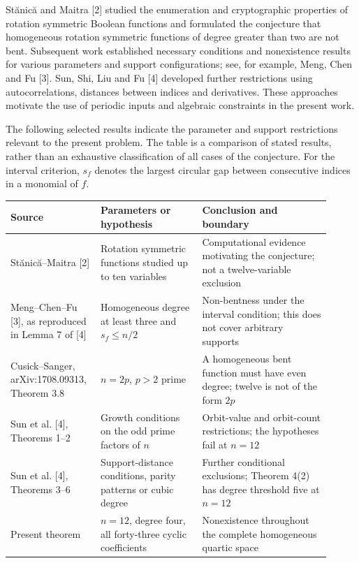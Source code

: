 \documentclass[pdflatex,sn-mathphys-num]{sn-jnl}
\begin{document}
St\u{a}nic\u{a} and Maitra [2] studied the enumeration and cryptographic properties of rotation symmetric Boolean functions and formulated the conjecture that homogeneous rotation symmetric functions of degree greater than two are not bent. Subsequent work established necessary conditions and nonexistence results for various parameters and support configurations; see, for example, Meng, Chen and Fu [3]. Sun, Shi, Liu and Fu [4] developed further restrictions using autocorrelations, distances between indices and derivatives. These approaches motivate the use of periodic inputs and algebraic constraints in the present work.

The following selected results indicate the parameter and support restrictions relevant to the present problem. The table is a comparison of stated results, rather than an exhaustive classification of all cases of the conjecture. For the interval criterion, $s_f$ denotes the largest circular gap between consecutive indices in a monomial of $f$.

{\footnotesize
\setlength{\tabcolsep}{3pt}

\begin{longtable}{@{}>{\raggedright\arraybackslash}p{0.23\linewidth}>{\raggedright\arraybackslash}p{0.3\linewidth}>{\raggedright\arraybackslash}p{0.38\linewidth}@{}}
\toprule
Source & Parameters or hypothesis & Conclusion and boundary \\
\midrule\endhead
St\u{a}nic\u{a}--Maitra [2] & Rotation symmetric functions studied up to ten variables & Computational evidence motivating the conjecture; not a twelve-variable exclusion \\
Meng--Chen--Fu [3], as reproduced in Lemma 7 of [4] & Homogeneous degree at least three and $s_f\le n/2$ & Non-bentness under the interval condition; this does not cover arbitrary supports \\
Cusick--Sanger, arXiv:1708.09313, Theorem 3.8 & $n=2p$, $p>2$ prime & A homogeneous bent function must have even degree; twelve is not of the form $2p$ \\
Sun et al. [4], Theorems 1--2 & Growth conditions on the odd prime factors of $n$ & Orbit-value and orbit-count restrictions; the hypotheses fail at $n=12$ \\
Sun et al. [4], Theorems 3--6 & Support-distance conditions, parity patterns or cubic degree & Further conditional exclusions; Theorem 4(2) has degree threshold five at $n=12$ \\
Present theorem & $n=12$, degree four, all forty-three cyclic coefficients & Nonexistence throughout the complete homogeneous quartic space \\
\bottomrule
\end{longtable}

}
\end{document}
